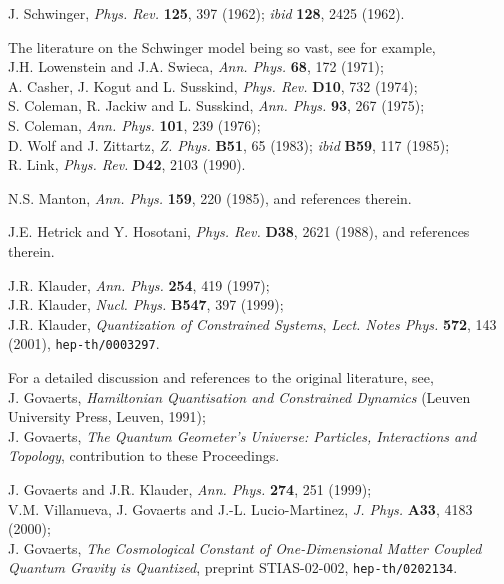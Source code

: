 \documentclass[a4paper,11pt]{article}
\begin{document}
\clearpage

\begin{thebibliography}{99}

J. Schwinger, {\em Phys. Rev.\/} {\bf 125}, 397 (1962);
{\it ibid} {\bf 128}, 2425 (1962).

 The literature on the Schwinger model being so vast,
see for example,\\
J.H. Lowenstein and J.A. Swieca, {\em Ann. Phys.\/} {\bf 68}, 172 (1971);\\
A. Casher, J. Kogut and L. Susskind, {\em Phys. Rev.\/} {\bf D10}, 732 (1974);\\
S. Coleman, R. Jackiw and L. Susskind, {\em Ann. Phys.\/} 
{\bf 93}, 267 (1975);\\
S. Coleman, {\em Ann. Phys.\/} {\bf 101}, 239 (1976);\\
D. Wolf and J. Zittartz, {\em Z. Phys.\/} {\bf B51}, 65 (1983); {\it ibid}
{\bf B59}, 117 (1985);\\
R. Link, {\em Phys. Rev.\/} {\bf D42}, 2103 (1990).

N.S. Manton, {\em Ann. Phys.\/} {\bf 159}, 220 (1985), and references therein.

J.E. Hetrick and Y. Hosotani, {\em Phys. Rev.\/} {\bf D38}, 
2621 (1988), and re\-fe\-ren\-ces therein.

J.R. Klauder, {\em Ann. Phys.\/} {\bf 254}, 419 (1997);\\
J.R. Klauder, {\em Nucl. Phys.\/} {\bf B547}, 397 (1999);\\
J.R. Klauder, {\sl Quantization of Constrained Systems\/},
{\sl Lect. Notes Phys.\/} {\bf 572}, 143 (2001), {\tt hep-th/0003297}.

For a detailed discussion and references to the original literature, see,\\
J. Govaerts, {\sl Hamiltonian Quantisation and Constrained Dynamics\/}
(Leuven University Press, Leuven, 1991);\\
J. Govaerts, {\sl The Quantum Geometer's Universe: Particles, Interactions and
Topology\/}, contribution to these Proceedings.

J. Govaerts and J.R. Klauder, {\em Ann. Phys.\/} {\bf 274}, 251 (1999);\\
V.M. Villanueva, J. Govaerts and J.-L. Lucio-Martinez, {\em J. Phys.\/}
{\bf A33}, 4183 (2000);\\
 J. Govaerts, {\sl The Cosmological Constant of One-Dimensional
Matter Coupled Quantum Gravity is Quantized\/},
preprint STIAS-02-002, {\tt hep-th/0202134}.


\end{thebibliography}
\end{document}
